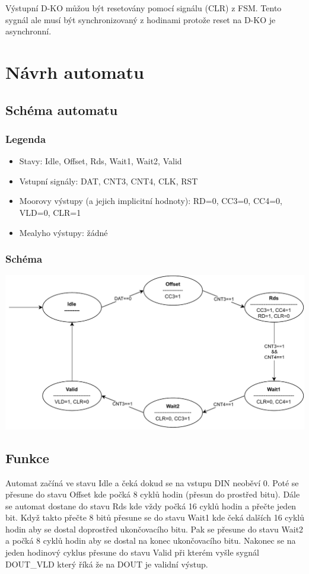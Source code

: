 \documentclass{article}
\begin{document}
Výstupní D-KO můžou být resetovány pomocí signálu (CLR) z FSM. Tento sygnál ale
musí být synchronizovaný z hodinami protože reset na D-KO je asynchronní.

\newpage

\section{Návrh automatu}

\subsection{Schéma automatu}

\subsubsection{Legenda}

\begin{itemize}
    \item Stavy: Idle, Offset, Rds, Wait1, Wait2, Valid
    \item Vstupní signály: DAT, CNT3, CNT4, CLK, RST
    \item Moorovy výstupy (a jejich implicitní hodnoty): RD=0, CC3=0, CC4=0,
          VLD=0, CLR=1
    \item Mealyho výstupy: žádné
\end{itemize}

\subsubsection{Schéma}

\includegraphics*[scale=0.9]{assets/FSM.pdf}

\subsection{Funkce}
Automat začíná ve stavu Idle a čeká dokud se na vstupu DIN neoběví 0. Poté se
přesune do stavu Offset kde počká 8 cyklů hodin (přesun do prostřed bitu). Dále
se automat dostane do stavu Rds kde vždy počká 16 cyklů hodin a přečte jeden
bit. Když takto přečte 8 bitů přesune se do stavu Wait1 kde čeká dalších 16
cyklů hodin aby se dostal doprostřed ukončovacího bitu. Pak se přesune do stavu
Wait2 a počká 8 cyklů hodin aby se dostal na konec ukončovacího bitu. Nakonec
se na jeden hodinový cyklus přesune do stavu Valid při kterém vyšle sygnál
DOUT\_VLD který říká že na DOUT je validní výstup.
\end{document}
